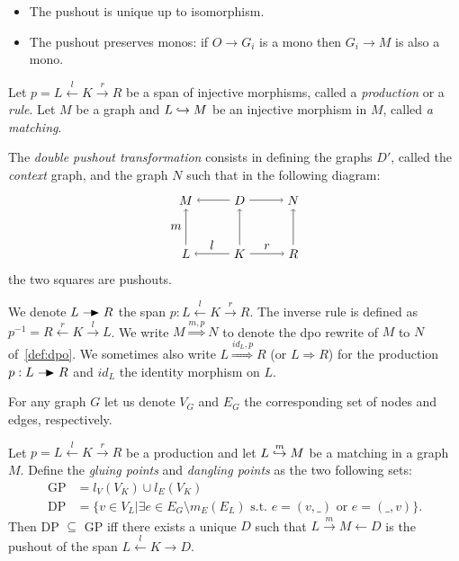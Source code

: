 \begin{property}
  \begin{itemize}
  \item The pushout is unique up to isomorphism.
  \item The pushout preserves monos: if $O\to G_i$ is a mono then $G_i\to M$ is also a mono.
  \end{itemize}
\end{property}

\begin{definition}
\label{def:dpo}
  Let $p = L\overset{l}{\leftarrow} K \overset{r}{\rightarrow} R$ be a span of injective morphisms, called a \emph{production} or a \emph{rule}. Let $M$ be a graph and $L\hookrightarrow M$ be an injective morphism in $M$, called \emph{a matching}.

  The \emph{double pushout transformation} consists in defining the graphs $D'$, called the \emph{context} graph, and the graph $N$ such that in the following diagram:
  \[
  \begin{tikzpicture} %
    \node (l) at (-1.5,0) {\(L\)};
    \node (d) at (0,0) {\(K\)};
    \node (r) at (1.5,0) {\(R\)};
    \node (m) at (-1.5,1.5) {\(M\)};
    \node (d') at (0,1.5) {\(D\)};
    \node (n) at (1.5,1.5) {\(N\)};
    \draw [->] (d) -- node [above,midway] {\(l\)} (l);
    \draw [->] (d) -- node [above,midway] {\(r\)} (r);
    \draw [->] (d') -- (m);
    \draw [->] (d') -- (n);
    \draw [->] (l) -- node [left,midway] {\(m\)}  (m);
    \draw [->] (d) -- (d');
    \draw [->] (r) -- (n);
  \end{tikzpicture}
  \]
  the two squares are pushouts.
\end{definition}

  We denote $L\action R$ the span $p:L\overset{l}{\leftarrow} K \overset{r}{\rightarrow} R$. The inverse rule is defined as $p^{-1} = R\overset{r}{\leftarrow} K \overset{l}{\rightarrow} L$.
  We write $M\overset{m,p}{\Rightarrow}N$ to denote the dpo rewrite of $M$ to $N$ of~\autoref{def:dpo}.
  We sometimes also write $L\overset{\mathit{id}_L,p}{\Rightarrow}R$ (or $L{\Rightarrow}R$) for the production $p:L\action R$ and $\mathit{id}_L$ the identity morphism on $L$.

  For any graph $G$ let us denote $V_G$ and $E_G$ the corresponding set of nodes and edges, respectively.

\begin{property}
  Let $p = L\overset{l}{\leftarrow} K \overset{r}{\rightarrow} R$ be a production and let $L\overset{m}{\hookrightarrow} M$ be a matching in a graph $M$.
  Define the \emph{gluing points} and \emph{dangling points} as the two following sets:
  \begin{align*}
  \text{GP} &= l_V(V_K)\cup l_E(V_K)\\
  \text{DP} &= \{ v\in V_L \big| \exists e\in E_G\setminus m_E(E_L)\text{ s.t. }e=(v,\_)\text{ or }e=(\_, v)\}.
  \end{align*}
  Then DP $\subseteq$ GP iff there exists a unique $D$ such that $L\overset{m}{\rightarrow} M{\leftarrow} D$ is the pushout of the span $ L\overset{l}{\leftarrow} K {\rightarrow} D$.
\end{property}

